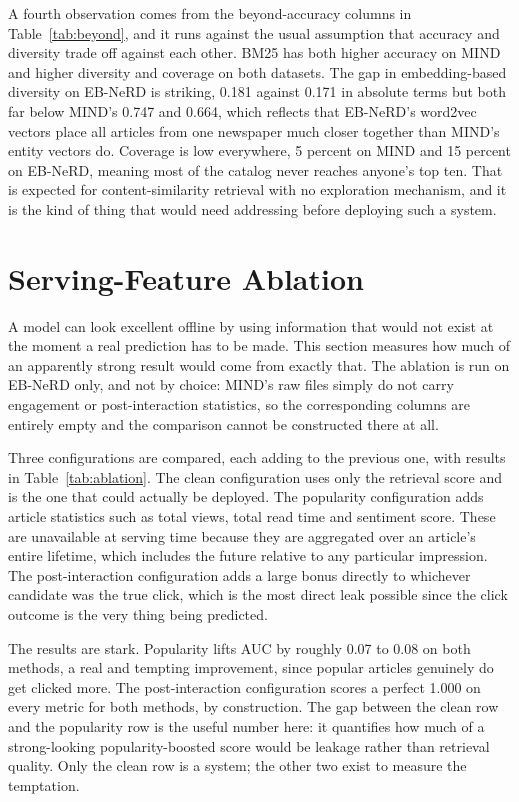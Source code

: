 \documentclass[11pt]{article}
\begin{document}
A fourth observation comes from the beyond-accuracy columns in Table~\ref{tab:beyond}, and it
runs against the usual assumption that accuracy and diversity trade off against each other.
BM25 has both higher accuracy on MIND and higher diversity and coverage on both datasets. The
gap in embedding-based diversity on EB-NeRD is striking, 0.181 against 0.171 in absolute terms
but both far below MIND's 0.747 and 0.664, which reflects that EB-NeRD's word2vec vectors place
all articles from one newspaper much closer together than MIND's entity vectors do. Coverage is
low everywhere, 5 percent on MIND and 15 percent on EB-NeRD, meaning most of the catalog never
reaches anyone's top ten. That is expected for content-similarity retrieval with no
exploration mechanism, and it is the kind of thing that would need addressing before deploying
such a system.

\section{Serving-Feature Ablation}
\label{sec:ablation}

A model can look excellent offline by using information that would not exist at the moment a
real prediction has to be made. This section measures how much of an apparently strong result
would come from exactly that. The ablation is run on EB-NeRD only, and not by choice: MIND's
raw files simply do not carry engagement or post-interaction statistics, so the corresponding
columns are entirely empty and the comparison cannot be constructed there at all.

Three configurations are compared, each adding to the previous one, with results in
Table~\ref{tab:ablation}. The clean configuration uses only the retrieval score and is the one
that could actually be deployed. The popularity configuration adds article statistics such as
total views, total read time and sentiment score. These are unavailable at serving time
because they are aggregated over an article's entire lifetime, which includes the future
relative to any particular impression. The post-interaction configuration adds a large bonus
directly to whichever candidate was the true click, which is the most direct leak possible
since the click outcome is the very thing being predicted.

The results are stark. Popularity lifts AUC by roughly 0.07 to 0.08 on both methods, a real and
tempting improvement, since popular articles genuinely do get clicked more. The
post-interaction configuration scores a perfect 1.000 on every metric for both methods, by
construction. The gap between the clean row and the popularity row is the useful number here:
it quantifies how much of a strong-looking popularity-boosted score would be leakage rather
than retrieval quality. Only the clean row is a system; the other two exist to measure the
temptation.
\end{document}
